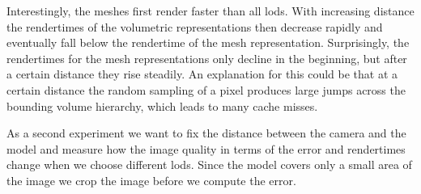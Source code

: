 Interestingly, the meshes first render faster than all \acsp{lod}.
With increasing distance the rendertimes of the volumetric representations then decrease rapidly and eventually fall below the rendertime of the mesh representation.
Surprisingly, the rendertimes for the mesh representations only decline in the beginning, but after a certain distance they rise steadily.
An explanation for this could be that at a certain distance the random sampling of a pixel produces large jumps across the bounding volume hierarchy, which leads to many cache misses.


As a second experiment we want to fix the distance between the camera and the model and measure how the image quality in terms of the \FLIP error and rendertimes change when we choose different \acsp{lod}.
Since the model covers only a small area of the image we crop the image before we compute the \FLIP error.
